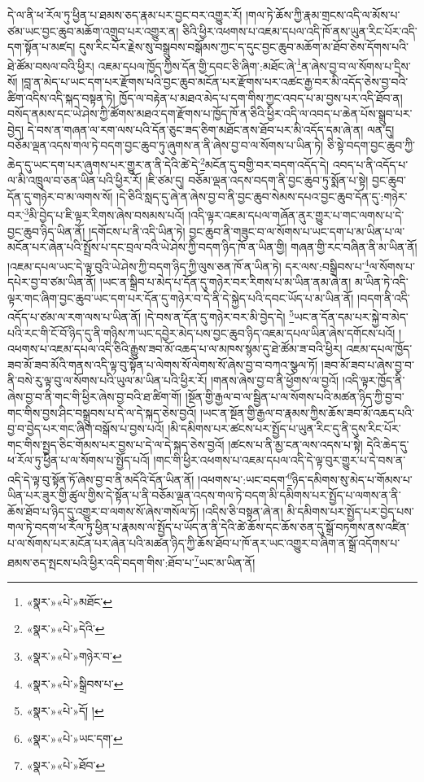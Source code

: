 དེ་ལ་ནི་ཕ་རོལ་ཏུ་ཕྱིན་པ་ཐམས་ཅད་རྣམ་པར་བྱང་བར་འགྱུར་རོ། །གལ་ཏེ་ཆོས་ཀྱི་རྣམ་གྲངས་འདི་ལ་མོས་པ་ཙམ་ཡང་བྱང་ཆུབ་མཆོག་འགྲུབ་པར་འགྱུར་ན། ཅིའི་ཕྱིར་འཕགས་པ་འཇམ་དཔལ་འདི་ཁོ་ནས་ཡུན་རིང་པོར་འདི་དག་སྟོན་པ་མཛད། དུས་རིང་པོར་རྗེས་སུ་བསྒྲུབས་བསྒོམས་ཀྱང་ད་དུང་བྱང་ཆུབ་མཆོག་མ་ཐོབ་ཅེས་དོགས་པའི་ཐེ་ཚོམ་བསལ་བའི་ཕྱིར། འཇམ་དཔལ་ཁྱོད་ཀྱིས་དོན་གྱི་དབང་ཅི་ཞིག་:མཐོང་ཞེ་\footnote{«སྣར་»«པེ་»མཐོང་}ན་ཞེས་བྱ་བ་ལ་སོགས་པ་དྲིས་སོ། །བླ་ན་མེད་པ་ཡང་དག་པར་རྫོགས་པའི་བྱང་ཆུབ་མངོན་པར་རྫོགས་པར་འཚང་རྒྱ་བར་མི་འདོད་ཅེས་བྱ་བའི་ཚིག་འདིས་འདི་སྐད་བསྟན་ཏེ། ཁྱོད་ལ་བརྟེན་པ་མཐའ་མེད་པ་དག་གིས་ཀྱང་འབད་པ་མ་བྱས་པར་འདི་ཐོབ་ན། བསོད་ནམས་དང་ཡེ་ཤེས་ཀྱི་ཚོགས་མཐའ་དག་རྫོགས་པ་ཁྱོད་ཁོ་ན་ཅིའི་ཕྱིར་འདི་ལ་འབད་པ་ཆེན་པོས་སྒྲུབ་པར་བྱེད། དེ་བས་ན་གཞན་ལ་རག་ལས་པའི་དོན་ཅུང་ཟད་ཅིག་མཐོང་ནས་ཐོབ་པར་མི་འདོད་དམ་ཞེ་ན། ལན་དུ། བཅོམ་ལྡན་འདས་གལ་ཏེ་བདག་བྱང་ཆུབ་ཏུ་ཞུགས་ན་ནི་ཞེས་བྱ་བ་ལ་སོགས་པ་ཡིན་ཏེ། ཅི་སྟེ་བདག་བྱང་ཆུབ་ཀྱི་ཆེད་དུ་ཡང་དག་པར་ཞུགས་པར་གྱུར་ན་ནི་དེའི་ཚེ་དེ་\footnote{«སྣར་»«པེ་»དེའི་}མངོན་དུ་བགྱི་བར་བདག་འདོད་དེ། འབད་པ་ནི་འདོད་པ་ལ་མི་འཁྲུལ་བ་ཅན་ཡིན་པའི་ཕྱིར་རོ། །ཇི་ཙམ་དུ། བཅོམ་ལྡན་འདས་བདག་ནི་བྱང་ཆུབ་ཏུ་སྨོན་པ་སྟེ། བྱང་ཆུབ་དོན་དུ་གཉེར་བ་མ་ལགས་སོ། །དེ་ཅིའི་སླད་དུ་ཞེ་ན་ཞེས་བྱ་བ་ནི་བྱང་ཆུབ་སེམས་དཔའ་བྱང་ཆུབ་དོན་དུ་:གཉེར་བར་\footnote{«སྣར་»«པེ་»གཉེར་བ་}མི་བྱེད་པ་ཇི་ལྟར་རིགས་ཞེས་བསམས་པའོ། །འདི་ལྟར་འཇམ་དཔལ་གཞོན་ནུར་གྱུར་པ་གང་ལགས་པ་དེ་བྱང་ཆུབ་ཉིད་ཡིན་ནོ། །དགོངས་པ་ནི་འདི་ཡིན་ཏེ། བྱང་ཆུབ་ནི་གཟུང་བ་ལ་སོགས་པ་ཡང་དག་པ་མ་ཡིན་པ་ལ་མངོན་པར་ཞེན་པའི་སྤྲོས་པ་དང་བྲལ་བའི་ཡེ་ཤེས་ཀྱི་བདག་ཉིད་ཁོ་ན་ཡིན་གྱི། གཞན་གྱི་རང་བཞིན་ནི་མ་ཡིན་ནོ། །འཇམ་དཔལ་ཡང་དེ་ལྟ་བུའི་ཡེ་ཤེས་ཀྱི་བདག་ཉིད་ཀྱི་ལུས་ཅན་ཁོ་ན་ཡིན་ཏེ། དར་ལས་:བསྒྲིབས་པ་\footnote{«སྣར་»«པེ་»སྒྲིབས་པ་}ལ་སོགས་པ་དཔེར་བྱ་བ་ཙམ་ཡིན་ནོ། །ཡང་ན་སྒྲིབ་པ་མེད་པ་དོན་དུ་གཉེར་བར་རིགས་པ་མ་ཡིན་ནམ་ཞེ་ན། མ་ཡིན་ཏེ་འདི་ལྟར་གང་ཞིག་བྱང་ཆུབ་ཡང་དག་པར་དོན་དུ་གཉེར་བ་དེ་ནི་དེ་སྐྱེད་པའི་དབང་ཡོད་པ་མ་ཡིན་ནོ། །བདག་ནི་འདི་འདོད་པ་ཙམ་ལ་རག་ལས་པ་ཡིན་ནོ། །དེ་བས་ན་དོན་དུ་གཉེར་བར་མི་བྱེད་དེ། \footnote{«སྣར་»«པེ་»དོ། ། }ཡང་ན་དོན་དམ་པར་སྐྱེ་བ་མེད་པའི་རང་གི་ངོ་བོ་ཉིད་དུ་ནི་གཉིས་ཀ་ཡང་དབྱེར་མེད་པས་བྱང་ཆུབ་ཉིད་འཇམ་དཔལ་ཡིན་ཞེས་དགོངས་པའོ། །འཕགས་པ་འཇམ་དཔལ་འདི་ཅིའི་རྒྱུས་ཟབ་མོ་འཆད་པ་ལ་མཁས་སྙམ་དུ་ཐེ་ཚོམ་ཟ་བའི་ཕྱིར། འཇམ་དཔལ་ཁྱོད་ཟབ་མོ་ཟབ་མོའི་གནས་འདི་ལྟ་བུ་སྟོན་པ་ལེགས་སོ་ལེགས་སོ་ཞེས་བྱ་བ་བཀའ་སྩལ་ཏོ། །ཟབ་མོ་ཟབ་པ་ཞེས་བྱ་བ་ནི་བསེ་རུ་ལྟ་བུ་ལ་སོགས་པའི་ཡུལ་མ་ཡིན་པའི་ཕྱིར་རོ། །གནས་ཞེས་བྱ་བ་ནི་ཕྱོགས་ལ་བྱའོ། །འདི་ལྟར་ཁྱོད་ནི་ཞེས་བྱ་བ་ནི་གང་གི་ཕྱིར་ཞེས་བྱ་བའི་ཐ་ཚིག་གོ། །སྔོན་གྱི་རྒྱལ་བ་ལ་སྦྱིན་པ་ལ་སོགས་པའི་མཚན་ཉིད་ཀྱི་བྱ་བ་གང་གིས་བྱས་ཤིང་བསྒྲུབས་པ་དེ་ལ་དེ་སྐད་ཅེས་བྱའོ། །ཡང་ན་སྔོན་གྱི་རྒྱལ་བ་རྣམས་ཀྱིས་ཆོས་ཟབ་མོ་འཆད་པའི་བྱ་བ་བྱེད་པར་གང་ཞིག་བསྒོས་པ་བྱས་པའོ། །མི་དམིགས་པར་ཚངས་པར་སྤྱོད་པ་ཡུན་རིང་དུ་ནི་དུས་རིང་པོར་གང་གིས་སྤྱད་ཅིང་གོམས་པར་བྱས་པ་དེ་ལ་དེ་སྐད་ཅེས་བྱའོ། །ཚངས་པ་ནི་མྱ་ངན་ལས་འདས་པ་སྟེ། དེའི་ཆེད་དུ་ཕ་རོལ་ཏུ་ཕྱིན་པ་ལ་སོགས་པ་སྤྱོད་པའོ། །གང་གི་ཕྱིར་འཕགས་པ་འཇམ་དཔལ་འདི་དེ་ལྟ་བུར་གྱུར་པ་དེ་བས་ན་འདི་དེ་ལྟ་བུ་སྟོན་ཏོ་ཞེས་བྱ་བ་ནི་མདོའི་དོན་ཡིན་ནོ། །འཕགས་པ་:ཡང་བདག་\footnote{«སྣར་»«པེ་»ཡང་དག་}ཉིད་དམིགས་སུ་མེད་པ་གོམས་པ་ཡིན་པར་ཟུར་གྱི་ཚུལ་གྱིས་དེ་སྟོན་པ་ནི་བཅོམ་ལྡན་འདས་གལ་ཏེ་བདག་མི་དམིགས་པར་སྤྱོད་པ་ལགས་ན་ནི་ཆོས་ཐོབ་པ་ཉིད་དུ་འགྱུར་བ་ལགས་སོ་ཞེས་གསོལ་ཏོ། །འདིས་ཅི་བསྟན་ཞེ་ན། མི་དམིགས་པར་སྤྱོད་པར་བྱེད་པས་གལ་ཏེ་བདག་ཕ་རོལ་ཏུ་ཕྱིན་པ་རྣམས་ལ་སྤྱོད་པ་ཡོད་ན་ནི་དེའི་ཚེ་ཆོས་དང་ཆོས་ཅན་དུ་སྒྲོ་བཏགས་ནས་འཛིན་པ་ལ་སོགས་པར་མངོན་པར་ཞེན་པའི་མཚན་ཉིད་ཀྱི་ཆོས་ཐོབ་པ་ཁོ་ནར་ཡང་འགྱུར་བ་ཞིག་ན་སྒྲོ་འདོགས་པ་ཐམས་ཅད་སྤངས་པའི་ཕྱིར་འདི་བདག་གིས་:ཐོབ་པ་\footnote{«སྣར་»«པེ་»ཐོབ་}ཡང་མ་ཡིན་ནོ། 